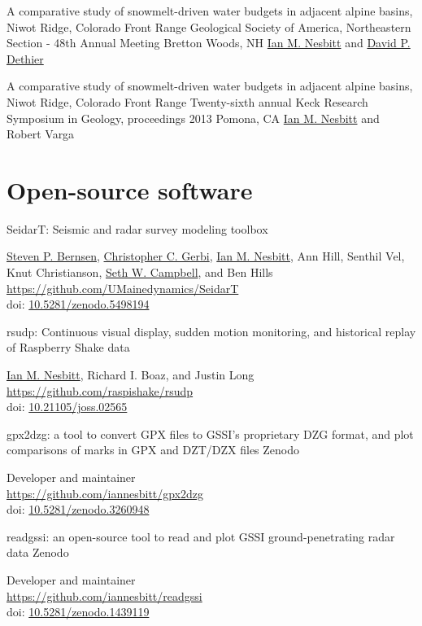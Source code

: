 \documentclass[a4paper,12pt,sans,colorlinks]{moderncv}
\newcommand{\me}{\href{https://www.iannesbitt.org}{Ian M. Nesbitt}}
\newcommand{\seth}{\href{https://www.alpinesciences.net}{Seth W. Campbell}}
\newcommand{\stevebernsen}{\href{https://watc.alaska.edu/node/73}{Steven P. Bernsen}}
\newcommand{\chris}{\href{https://umaine.edu/earthclimate/people/christopher-gerbi/}{Christopher C. Gerbi}}
\newcommand{\richard}{Richard I. Boaz}
\newcommand{\david}{\href{https://geosciences.williams.edu/profile/ddethier/}{David P. Dethier}}
\newcommand{\doi}[1]{%
    \href{https://doi.org/#1}{#1}
}
\begin{document}
{A comparative study of snowmelt-driven water budgets in
adjacent alpine basins, Niwot Ridge, Colorado Front Range}
{Geological Society of America, Northeastern Section - 48th Annual Meeting}
{Bretton Woods, NH}
{}
{
    \me{} and \david{}
}

{A comparative study of snowmelt-driven water budgets in
adjacent alpine basins, Niwot Ridge, Colorado Front Range}
{Twenty-sixth annual Keck Research Symposium in Geology, proceedings 2013}
{Pomona, CA}
{}
{
    \me{} and Robert Varga
}


\section{Open-source software}

{SeidarT: Seismic and radar survey modeling toolbox}
{}
{}
{}
{
    \stevebernsen{}, \chris{}, \me{}, Ann Hill, Senthil Vel,
    Knut Christianson, \seth{}, and Ben Hills
    \\
    \url{https://github.com/UMainedynamics/SeidarT}
    \\
    doi: \doi{10.5281/zenodo.5498194}
}

{rsudp: Continuous visual display, sudden motion monitoring,
and historical replay of Raspberry Shake data}
{}
{}
{}
{
    \me{}, \richard{}, and Justin Long
    \\
    \url{https://github.com/raspishake/rsudp}
    \\
    doi: \doi{10.21105/joss.02565}
}

{gpx2dzg: a tool to convert GPX files to GSSI's proprietary DZG
format, and plot comparisons of marks in GPX and DZT/DZX files}
{Zenodo}
{}
{}
{
    Developer and maintainer
    \\
    \url{https://github.com/iannesbitt/gpx2dzg}
    \\
    doi: \doi{10.5281/zenodo.3260948}
}

{readgssi: an open-source tool to read and plot GSSI
ground-penetrating radar data}
{Zenodo}
{}
{}
{
    Developer and maintainer
    \\
    \url{https://github.com/iannesbitt/readgssi}
    \\
    doi: \doi{10.5281/zenodo.1439119}
}


\end{document}
